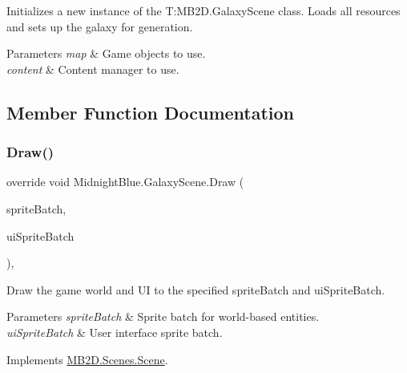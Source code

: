 Initializes a new instance of the T\+:\+M\+B2\+D.\+Galaxy\+Scene class. Loads all resources and sets up the galaxy for generation. 


\begin{DoxyParams}{Parameters}
{\em map} & Game objects to use.\\
\hline
{\em content} & Content manager to use.\\
\hline
\end{DoxyParams}


\subsection{Member Function Documentation}
\hypertarget{class_midnight_blue_1_1_galaxy_scene_a3646fcf97e067bac267d42aad66e71c4}{}\label{class_midnight_blue_1_1_galaxy_scene_a3646fcf97e067bac267d42aad66e71c4} 
\subsubsection{\texorpdfstring{Draw()}{Draw()}}
{\footnotesize\ttfamily override void Midnight\+Blue.\+Galaxy\+Scene.\+Draw (\begin{DoxyParamCaption}\item[{Sprite\+Batch}]{sprite\+Batch,  }\item[{Sprite\+Batch}]{ui\+Sprite\+Batch }\end{DoxyParamCaption})\hspace{0.3cm}{\ttfamily [inline]}, {\ttfamily [virtual]}}



Draw the game world and UI to the specified sprite\+Batch and ui\+Sprite\+Batch. 


\begin{DoxyParams}{Parameters}
{\em sprite\+Batch} & Sprite batch for world-\/based entities.\\
\hline
{\em ui\+Sprite\+Batch} & User interface sprite batch.\\
\hline
\end{DoxyParams}


Implements \hyperlink{class_m_b2_d_1_1_scenes_1_1_scene_a932d33071ecb4c5187367825dba72324}{M\+B2\+D.\+Scenes.\+Scene}.

